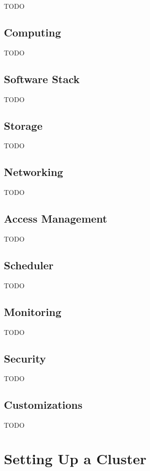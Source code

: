 TODO

\subsection{Computing}

TODO

\subsection{Software Stack}

TODO

\subsection{Storage}

TODO

\subsection{Networking}

TODO

\subsection{Access Management}

TODO

\subsection{Scheduler}

TODO

\subsection{Monitoring}

TODO

\subsection{Security}

TODO

\subsection{Customizations}

TODO

\section{Setting Up a Cluster}

